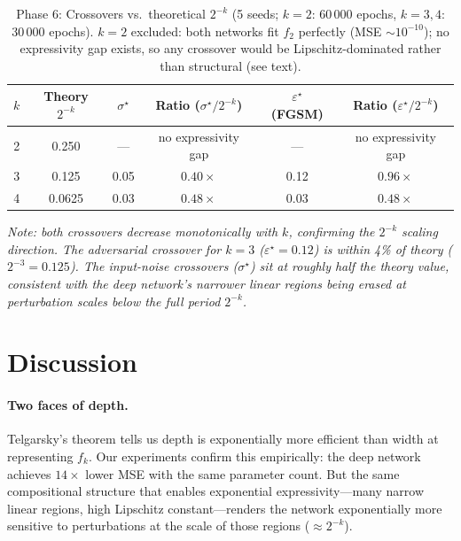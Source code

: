 \documentclass[10pt,twocolumn]{article}
\newcommand{\epst}{\varepsilon^\star}
\newcommand{\sigt}{\sigma^\star}
\begin{document}
\begin{table}[h]
\small
\centering
\caption{Phase 6: Crossovers vs.\ theoretical $2^{-k}$ (5 seeds; $k=2$: 60\,000 epochs,
  $k=3,4$: 30\,000 epochs).
  $k=2$ excluded: both networks fit $f_2$ perfectly (MSE $\sim 10^{-10}$);
  no expressivity gap exists, so any crossover would be Lipschitz-dominated
  rather than structural (see text).}
\label{tab:scaling}
\begin{tabular}{cccccc}
\toprule
$k$ & Theory $2^{-k}$ & $\sigt$ & Ratio ($\sigt/2^{-k}$) & $\epst$ (FGSM) & Ratio ($\epst/2^{-k}$) \\
\midrule
2    & 0.250  & ---  & no expressivity gap & ---  & no expressivity gap \\
3    & 0.125  & 0.05 & $0.40\times$        & 0.12 & $0.96\times$        \\
4    & 0.0625 & 0.03 & $0.48\times$        & 0.03 & $0.48\times$        \\
\bottomrule
\end{tabular}
\end{table}

\noindent\textit{Note: both crossovers decrease monotonically with $k$, confirming the
$2^{-k}$ scaling direction. The adversarial crossover for $k=3$ ($\epst=0.12$) is within
4\% of theory ($2^{-3}=0.125$). The input-noise crossovers ($\sigt$) sit at roughly half
the theory value, consistent with the deep network's narrower linear regions being erased
at perturbation scales below the full period $2^{-k}$.}

\section{Discussion}
\label{sec:discussion}

\paragraph{Two faces of depth.}
Telgarsky's theorem tells us depth is exponentially more efficient than width at representing
$f_k$. Our experiments confirm this empirically: the deep network achieves $14\times$ lower
MSE with the same parameter count. But the same compositional structure that enables
exponential expressivity—many narrow linear regions, high Lipschitz constant—renders the
network exponentially more sensitive to perturbations at the scale of those regions
($\approx 2^{-k}$).
\end{document}
